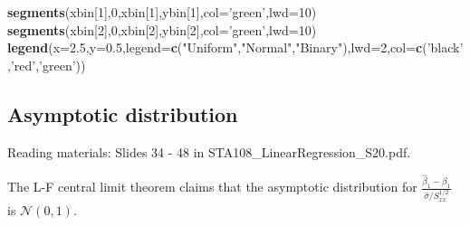 \documentclass[12pt,]{book}
\newenvironment{Shaded}{\begin{snugshade}}{\end{snugshade}}
\newcommand{\KeywordTok}[1]{\textcolor[rgb]{0.13,0.29,0.53}{\textbf{#1}}}
\newcommand{\DataTypeTok}[1]{\textcolor[rgb]{0.13,0.29,0.53}{#1}}
\newcommand{\DecValTok}[1]{\textcolor[rgb]{0.00,0.00,0.81}{#1}}
\newcommand{\FloatTok}[1]{\textcolor[rgb]{0.00,0.00,0.81}{#1}}
\newcommand{\StringTok}[1]{\textcolor[rgb]{0.31,0.60,0.02}{#1}}
\newcommand{\NormalTok}[1]{#1}
\begin{document}
\begin{Shaded}
\begin{Highlighting}[]
\KeywordTok{segments}\NormalTok{(xbin[}\DecValTok{1}\NormalTok{],}\DecValTok{0}\NormalTok{,xbin[}\DecValTok{1}\NormalTok{],ybin[}\DecValTok{1}\NormalTok{],}\DataTypeTok{col=}\StringTok{'green'}\NormalTok{,}\DataTypeTok{lwd=}\DecValTok{10}\NormalTok{)}
\KeywordTok{segments}\NormalTok{(xbin[}\DecValTok{2}\NormalTok{],}\DecValTok{0}\NormalTok{,xbin[}\DecValTok{2}\NormalTok{],ybin[}\DecValTok{2}\NormalTok{],}\DataTypeTok{col=}\StringTok{'green'}\NormalTok{,}\DataTypeTok{lwd=}\DecValTok{10}\NormalTok{)}
\KeywordTok{legend}\NormalTok{(}\DataTypeTok{x=}\FloatTok{2.5}\NormalTok{,}\DataTypeTok{y=}\FloatTok{0.5}\NormalTok{,}\DataTypeTok{legend=}\KeywordTok{c}\NormalTok{(}\StringTok{"Uniform"}\NormalTok{,}\StringTok{"Normal"}\NormalTok{,}\StringTok{"Binary"}\NormalTok{),}\DataTypeTok{lwd=}\DecValTok{2}\NormalTok{,}\DataTypeTok{col=}\KeywordTok{c}\NormalTok{(}\StringTok{'black'}\NormalTok{,}\StringTok{'red'}\NormalTok{,}\StringTok{'green'}\NormalTok{))}
\end{Highlighting}
\end{Shaded}

\subsection{Asymptotic distribution}\label{asymptotic-distribution}

Reading materials: Slides 34 - 48 in STA108\_LinearRegression\_S20.pdf.

The L-F central limit theorem claims that the asymptotic distribution
for \(\frac{\hat{\beta}_1 - \beta_1}{\hat{\sigma} / S_{xx}^{1/2} }\) is
\(\mathcal{N}(0,1)\).
\end{document}

